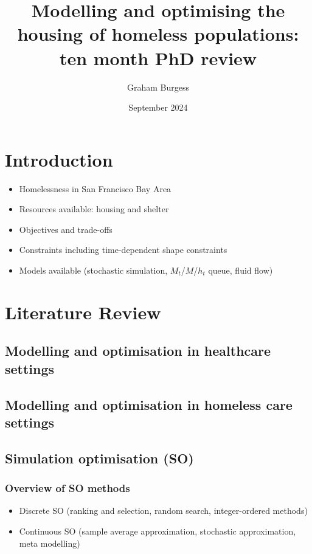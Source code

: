 \documentclass{article}
\title{Modelling and optimising the housing of homeless populations: ten month PhD review}
\author{Graham Burgess}
\date{September 2024}
\begin{document}
\maketitle

\section{Introduction}

\begin{itemize}
\item Homelessness in San Francisco Bay Area
\item Resources available: housing and shelter
\item Objectives and trade-offs
\item Constraints including time-dependent shape constraints
\item Models available (stochastic simulation, $M_t$/$M$/$h_t$ queue, fluid flow)
\end{itemize}

\section{Literature Review}

\subsection{Modelling and optimisation in healthcare settings}

\subsection{Modelling and optimisation in homeless care settings}

\subsection{Simulation optimisation (SO)}

\subsubsection{Overview of SO methods}

\begin{itemize}
\item Discrete SO (ranking and selection, random search, integer-ordered methods)
\item Continuous SO (sample average approximation, stochastic approximation, meta modelling)
\end{itemize}
\end{document}

